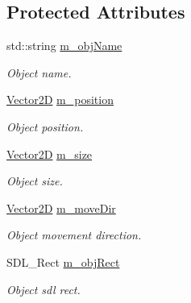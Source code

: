 \subsection*{Protected Attributes}
\begin{DoxyCompactItemize}
\item 
\mbox{\label{class_game_object_ac08df1fa51d5a9646329f51411d23115}} 
std\+::string \mbox{\hyperlink{class_game_object_ac08df1fa51d5a9646329f51411d23115}{m\+\_\+obj\+Name}}
\begin{DoxyCompactList}\small\item\em Object name. \end{DoxyCompactList}\item 
\mbox{\label{class_game_object_a537a0522171a0bcae4e0408268a065f4}} 
\mbox{\hyperlink{struct_vector2_d}{Vector2D}} \mbox{\hyperlink{class_game_object_a537a0522171a0bcae4e0408268a065f4}{m\+\_\+position}}
\begin{DoxyCompactList}\small\item\em Object position. \end{DoxyCompactList}\item 
\mbox{\label{class_game_object_aceffd1fcde86aec20792ae4dfd1971f4}} 
\mbox{\hyperlink{struct_vector2_d}{Vector2D}} \mbox{\hyperlink{class_game_object_aceffd1fcde86aec20792ae4dfd1971f4}{m\+\_\+size}}
\begin{DoxyCompactList}\small\item\em Object size. \end{DoxyCompactList}\item 
\mbox{\label{class_game_object_a2a1a7787bb90821c4b2b798b6e1ccc95}} 
\mbox{\hyperlink{struct_vector2_d}{Vector2D}} \mbox{\hyperlink{class_game_object_a2a1a7787bb90821c4b2b798b6e1ccc95}{m\+\_\+move\+Dir}}
\begin{DoxyCompactList}\small\item\em Object movement direction. \end{DoxyCompactList}\item 
\mbox{\label{class_game_object_a195bfc7005120bf46ad2fd426f36b089}} 
S\+D\+L\+\_\+\+Rect \mbox{\hyperlink{class_game_object_a195bfc7005120bf46ad2fd426f36b089}{m\+\_\+obj\+Rect}}
\begin{DoxyCompactList}\small\item\em Object sdl rect. \end{DoxyCompactList}\item 

\end{DoxyCompactItemize}
